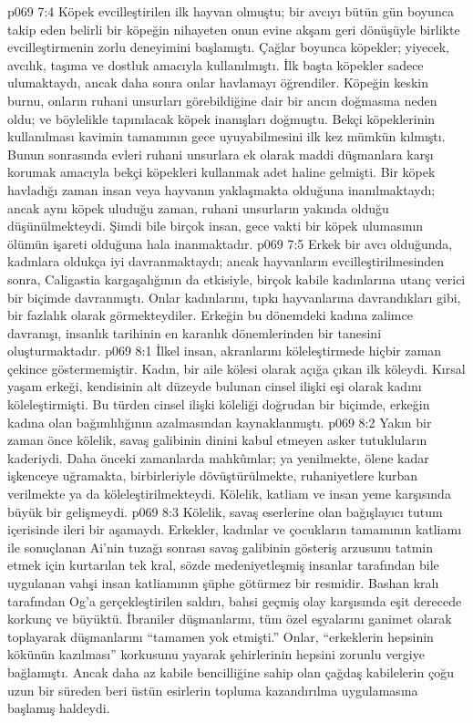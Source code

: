 \vs p069 7:4 Köpek evcilleştirilen ilk hayvan olmuştu; bir avcıyı bütün gün boyunca takip eden belirli bir köpeğin nihayeten onun evine akşam geri dönüşüyle birlikte evcilleştirmenin zorlu deneyimini başlamıştı. Çağlar boyunca köpekler; yiyecek, avcılık, taşıma ve dostluk amacıyla kullanılmıştı. İlk başta köpekler sadece ulumaktaydı, ancak daha sonra onlar havlamayı öğrendiler. Köpeğin keskin burnu, onların ruhani unsurları görebildiğine dair bir ancın doğmasına neden oldu; ve böylelikle tapınılacak köpek inanışları doğmuştu. Bekçi köpeklerinin kullanılması kavimin tamamının gece uyuyabilmesini ilk kez mümkün kılmıştı. Bunun sonrasında evleri ruhani unsurlara ek olarak maddi düşmanlara karşı korumak amacıyla bekçi köpekleri kullanmak adet haline gelmişti. Bir köpek havladığı zaman insan veya hayvanın yaklaşmakta olduğuna inanılmaktaydı; ancak aynı köpek uluduğu zaman, ruhani unsurların yakında olduğu düşünülmekteydi. Şimdi bile birçok insan, gece vakti bir köpek ulumasının ölümün işareti olduğuna hala inanmaktadır.
\vs p069 7:5 Erkek bir avcı olduğunda, kadınlara oldukça iyi davranmaktaydı; ancak hayvanların evcilleştirilmesinden sonra, Caligastia kargaşalığının da etkisiyle, birçok kabile kadınlarına utanç verici bir biçimde davranmıştı. Onlar kadınlarını, tıpkı hayvanlarına davrandıkları gibi, bir fazlalık olarak görmekteydiler. Erkeğin bu dönemdeki kadına zalimce davranışı, insanlık tarihinin en karanlık dönemlerinden bir tanesini oluşturmaktadır.
\vs p069 8:1 İlkel insan, akranlarını köleleştirmede hiçbir zaman çekince göstermemiştir. Kadın, bir aile kölesi olarak açığa çıkan ilk köleydi. Kırsal yaşam erkeği, kendisinin alt düzeyde bulunan cinsel ilişki eşi olarak kadını köleleştirmişti. Bu türden cinsel ilişki köleliği doğrudan bir biçimde, erkeğin kadına olan bağımlılığının azalmasından kaynaklanmıştı.
\vs p069 8:2 Yakın bir zaman önce kölelik, savaş galibinin dinini kabul etmeyen asker tutukluların kaderiydi. Daha önceki zamanlarda mahkûmlar; ya yenilmekte, ölene kadar işkenceye uğramakta, birbirleriyle dövüştürülmekte, ruhaniyetlere kurban verilmekte ya da köleleştirilmekteydi. Kölelik, katliam ve insan yeme karşısında büyük bir gelişmeydi.
\vs p069 8:3 Kölelik, savaş eserlerine olan bağışlayıcı tutum içerisinde ileri bir aşamaydı. Erkekler, kadınlar ve çocukların tamamının katliamı ile sonuçlanan Ai’nin tuzağı sonrası savaş galibinin gösteriş arzusunu tatmin etmek için kurtarılan tek kral, sözde medeniyetleşmiş insanlar tarafından bile uygulanan vahşi insan katliamının şüphe götürmez bir resmidir. Bashan kralı tarafından Og’a gerçekleştirilen saldırı, bahsi geçmiş olay karşısında eşit derecede korkunç ve büyüktü. İbraniler düşmanlarını, tüm özel eşyalarını ganimet olarak toplayarak düşmanlarını “tamamen yok etmişti.” Onlar, “erkeklerin hepsinin kökünün kazılması” korkusunu yayarak şehirlerinin hepsini zorunlu vergiye bağlamıştı. Ancak daha az kabile bencilliğine sahip olan çağdaş kabilelerin çoğu uzun bir süreden beri üstün esirlerin topluma kazandırılma uygulamasına başlamış haldeydi.
